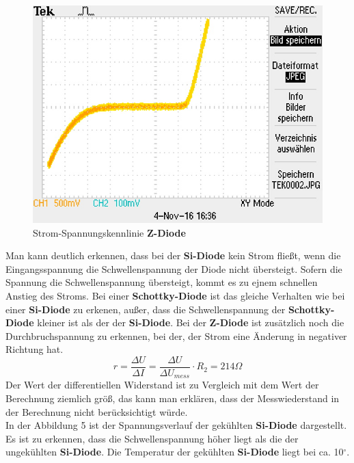 \begin{figure}[!h]
\begin{center}
\begin{minipage}{0.4\textwidth}
\includegraphics[scale=0.6]{bilder/Versuch2/zDiode}
\caption{Strom-Spannungskennlinie \textbf{Z-Diode}}
\end{minipage}
\end{center}
\end{figure}
\noindent
Man kann deutlich erkennen, dass bei der \textbf{Si-Diode} kein Strom flie\ss t, wenn die Eingangsspannung die Schwellenspannung der Diode nicht \"ubersteigt. Sofern die Spannung die Schwellenspannung \"ubersteigt, kommt es zu ejnem schnellen Anstieg des Stroms. Bei einer \textbf{Schottky-Diode} ist das gleiche Verhalten wie bei einer \textbf{Si-Diode} zu erkenen, au\ss er, dass die Schwellenspannung der \textbf{Schottky-Diode} kleiner ist als der der \textbf{Si-Diode}. Bei der \textbf{Z-Diode} ist zus\"atzlich noch die Durchbruchspannung zu erkennen, bei der, der Strom eine \"Anderung in negativer Richtung hat.
\\ 
\begin{equation*}
r =\frac{\Delta U}{\Delta I} = \frac{\Delta U}{\Delta U_{mess}} \cdot R_2 = 214 \Omega 
\end{equation*}
Der Wert der differentiellen Widerstand ist zu Vergleich mit dem Wert der Berechnung ziemlich gr\"o\ss, das kann man erkl\"aren, dass der Messwiederstand in der Berechnung nicht ber\"ucksichtigt w\"urde.\\ 
In der Abbildung 5 ist der Spannungsverlauf der gek\"uhlten \textbf{Si-Diode} dargestellt. Es ist zu erkennen, dass die Schwellenspannung h\"oher liegt als die der ungek\"uhlten \textbf{Si-Diode}. Die Temperatur der gek\"uhlten \textbf{Si-Diode} liegt bei ca. 10$^\circ$.
